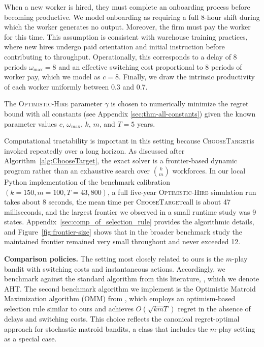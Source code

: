 \documentclass[opre,blindrev]{informs3}
\newcommand{\ChooseTarget}{\textsc{ChooseTarget}}
\begin{document}
When a new worker is hired, they must complete an onboarding process before becoming productive. We model onboarding as requiring a full 8-hour shift during which the worker generates no output. Moreover, the firm must pay the worker for this time. This assumption is consistent with warehouse training practices, where new hires undergo paid orientation and initial instruction before contributing to throughput. Operationally, this corresponds to a delay of 8 periods \(\omega_{\max}=8\) and an effective switching cost proportional to 8 periods of worker pay, which we model as \(c=8\). Finally, we draw the intrinsic productivity of each worker uniformly between 0.3 and 0.7. 

The \textsc{Optimistic-Hire} parameter \(\gamma\) is chosen to numerically minimize the regret bound with all constants (see Appendix \ref{sec:thm-all-constants}) given the known parameter values \(c\), \(\omega_{\max}\), \(k\), \(m\), and \(T=5\) years. 

Computational tractability is important in this setting because \ChooseTarget is invoked repeatedly over a long horizon. As discussed after Algorithm~\ref{alg:ChooseTarget}, the exact solver is a frontier-based dynamic program rather than an exhaustive search over \(\binom{k}{m}\) workforces. In our local Python implementation of the benchmark calibration \((k=150,m=100,T=43{,}800)\), a full five-year \textsc{Optimistic-Hire} simulation run takes about 8 seconds, the mean time per \ChooseTarget call is about 47 milliseconds, and the largest frontier we observed in a small runtime study was 9 states. Appendix~\ref{sec:comp_of_selection_rule} provides the algorithmic details, and Figure~\ref{fig:frontier-size} shows that in the broader benchmark study the maintained frontier remained very small throughout and never exceeded 12.

{\bf Comparison policies.}
The setting most closely related to ours is the \(m\)-play bandit with switching costs and instantaneous actions. Accordingly, we benchmark against the standard algorithm from this literature, \cite{agrawal1990switching}, which we denote \textsc{AHT}. The second benchmark algorithm we implement is the Optimistic Matroid Maximization algorithm (\textsc{OMM}) from \cite{kveton2014matroid}, which employs an optimism-based selection rule similar to ours and achieves \(O(\sqrt{kmT})\) regret in the absence of delays and switching costs. This choice reflects the canonical regret-optimal approach for stochastic matroid bandits, a class that includes the \(m\)-play setting as a special case.
\end{document}
